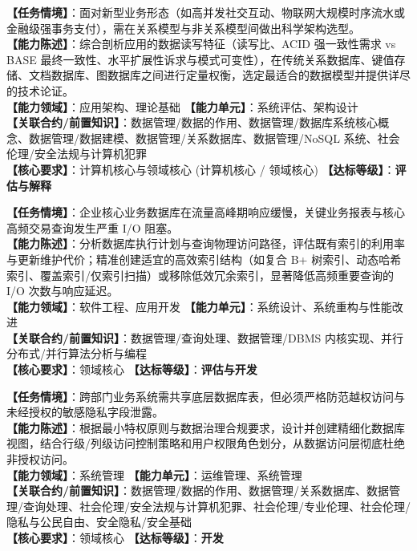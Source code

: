 \begin{taskbox}[任务 3：面向新应用场景评估并决策底层数据存储架构模型]
\textbf{【任务情境】}：面对新型业务形态（如高并发社交互动、物联网大规模时序流水或金融级强事务支付），需在关系模型与非关系模型间做出科学架构选型。\\
\textbf{【能力陈述】}：综合剖析应用的数据读写特征（读写比、ACID 强一致性需求 vs BASE 最终一致性、水平扩展性诉求与模式可变性），在传统关系数据库、键值存储、文档数据库、图数据库之间进行定量权衡，选定最适合的数据模型并提供详尽的技术论证。\\
\textbf{【能力领域】}：应用架构、理论基础 \quad \textbf{【能力单元】}：系统评估、架构设计\\
\textbf{【关联合约/前置知识】}：数据管理/数据的作用、数据管理/数据库系统核心概念、数据管理/数据建模、数据管理/关系数据库、数据管理/NoSQL 系统、社会伦理/安全法规与计算机犯罪\\
\textbf{【核心要求】}：计算机核心与领域核心 (计算机核心 / 领域核心) \quad \textbf{【达标等级】}：\textbf{评估与解释}
\end{taskbox}

\begin{taskbox}[任务 4：基于索引调优与查询计划优化数据库应用执行性能]
\textbf{【任务情境】}：企业核心业务数据库在流量高峰期响应缓慢，关键业务报表与核心高频交易查询发生严重 I/O 阻塞。\\
\textbf{【能力陈述】}：分析数据库执行计划与查询物理访问路径，评估既有索引的利用率与更新维护代价；精准创建适宜的高效索引结构（如复合 B+ 树索引、动态哈希索引、覆盖索引/仅索引扫描）或移除低效冗余索引，显著降低高频重要查询的 I/O 次数与响应延迟。\\
\textbf{【能力领域】}：软件工程、应用开发 \quad \textbf{【能力单元】}：系统设计、系统重构与性能改进\\
\textbf{【关联合约/前置知识】}：数据管理/查询处理、数据管理/DBMS 内核实现、并行分布式/并行算法分析与编程\\
\textbf{【核心要求】}：领域核心 \quad \textbf{【达标等级】}：\textbf{评估与开发}
\end{taskbox}

\begin{taskbox}[任务 5：基于视图与访问控制机制实现数据安全防护与权限隔离]
\textbf{【任务情境】}：跨部门业务系统需共享底层数据库表，但必须严格防范越权访问与未经授权的敏感隐私字段泄露。\\
\textbf{【能力陈述】}：根据最小特权原则与数据治理合规要求，设计并创建精细化数据库视图，结合行级/列级访问控制策略和用户权限角色划分，从数据访问层彻底杜绝非授权访问。\\
\textbf{【能力领域】}：系统管理 \quad \textbf{【能力单元】}：运维管理、系统管理\\
\textbf{【关联合约/前置知识】}：数据管理/数据的作用、数据管理/关系数据库、数据管理/查询处理、社会伦理/安全法规与计算机犯罪、社会伦理/专业伦理、社会伦理/隐私与公民自由、安全隐私/安全基础\\
\textbf{【核心要求】}：领域核心 \quad \textbf{【达标等级】}：\textbf{开发}
\end{taskbox}

